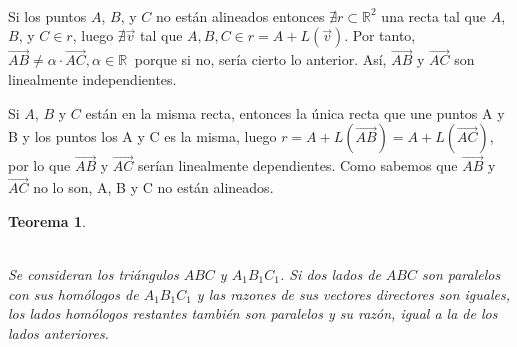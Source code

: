 \documentclass[11pt, a4paper]{article}
\makeatletter
\newif\IfInSansMode
\let\oldsf\sffamily
\renewcommand*{\sffamily}{\oldsf\mathversion{sans}\InSansModetrue}
\let\oldnorm\normalfont
\renewcommand*{\normalfont}{\oldnorm\InSansModefalse\mathversion{normal}}
\renewenvironment{proof}[1][\proofname] {\vspace{-15pt}\par\pushQED{\qed}\normalfont\topsep6\p@\@plus6\p@\relax\trivlist\item[\hskip\labelsep\it#1\@addpunct{.}]\ignorespaces}{\popQED\endtrivlist\@endpefalse}
\renewcommand{\vec}{\overrightarrow}
\renewenvironment{proof}[1][\proofname] {\par\pushQED{\qed}\normalfont\topsep6\p@\@plus6\p@\relax\trivlist\item[\hskip\labelsep\itshape\sffamily#1\@addpunct{.}]\ignorespaces}{\popQED\endtrivlist\@endpefalse}
\theoremstyle{theorem-style}
\newtheorem{nth}{Teorema}[section]
\theoremstyle{definition-style}
\theoremstyle{remark-style}
\theoremstyle{example-style}
\makeatother
\begin{document}
  \begin {proof}\hfill\\
    \boxed{\Rightarrow}
    Si los puntos $A$, $B$, y $C$ no están alineados entonces $\nexists r \subset \mathbb{R}^2$ una recta tal que $A$, $B$, y $C \in r$, luego $\nexists \vec{v}$ tal que $A,B,C \in r = A + L(\vec{v})$. Por tanto, $\overrightarrow{AB} \neq \alpha \cdot \overrightarrow{AC}, \alpha \in \mathbb{R}\ $ porque si no, sería cierto lo anterior. Así, $\overrightarrow{AB}$ y $\overrightarrow{AC}$ son linealmente independientes.

    \boxed{\Leftarrow} Si $A$, $B$ y $C$ están en la misma recta, entonces la única recta que une puntos A y B y los puntos los A y C es la misma, luego $r = A + L(\overrightarrow{AB})  = A + L(\overrightarrow{AC})$, por lo que $\overrightarrow{AB}$ y $\overrightarrow{AC}$ serían linealmente dependientes. Como sabemos que $\overrightarrow{AB}$ y $\overrightarrow{AC}$ no lo son, A, B y C no están alineados.
  \end{proof}

\begin{nth}\hfill\\
\begin{minipage}[c]{0.50\textwidth}
  \hfill\\
  Se consideran los triángulos $ABC$ y $A_1B_1C_1$. Si dos lados de $ABC$ son paralelos con sus homólogos de $A_1B_1C_1$ y las razones de sus vectores directores son iguales, los lados homólogos restantes también son paralelos y su razón, igual a la de los lados anteriores.
\end{minipage}\hfill
\begin{minipage}[]{0.47\textwidth}
\end{minipage}

  \end{nth}
  
\end{document}

